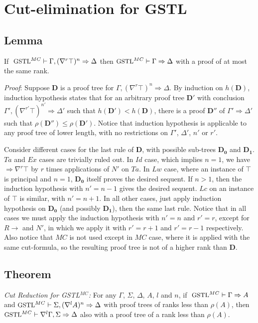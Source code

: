 \section{Cut-elimination for GSTL}

\subsection{Lemma}\label{true-assum} If $~\small\text{GSTL}^{MC} \vdash \Gamma , (\nabla^r \top)^n \Rightarrow \Delta$ then $\small\text{GSTL}^{MC} \vdash \Gamma \Rightarrow \Delta$ with a proof of at most the same rank.

\textit{Proof}: Suppose $\mathbf{D}$ is a proof tree for $\Gamma , (\nabla^r \top)^n \Rightarrow \Delta$. By induction on $h(\mathbf{D})$, induction hypothesis states that for an arbitrary proof tree $\mathbf{D}'$ with conclusion $\Gamma' , (\nabla^{r'} \top)^{n'} \Rightarrow \Delta'$ such that $h(\mathbf{D}') < h(\mathbf{D})$, there is a proof $\mathbf{D}''$ of $\Gamma' \Rightarrow \Delta'$ such that $\rho(\mathbf{D}'') \leq \rho(\mathbf{D}')$. Notice that induction hypothesis is applicable to any proof tree of lower length, with no restrictions on $\Gamma'$, $\Delta'$, $n'$ or $r'$.

Consider different cases for the last rule of $\mathbf{D}$, with possible sub-trees $\mathbf{D_0}$ and $\mathbf{D_1}$. $Ta$ and $Ex$ cases are trivially ruled out. In $Id$ case, which implies $n = 1$, we have $\Rightarrow \nabla^r \top$ by $r$ times applications of $N'$ on $Ta$. In $Lw$ case, where an instance of $\top$ is principal and $n = 1$, $\mathbf{D_0}$ itself proves the desired sequent. If $n > 1$, then the induction hypothesis with $n' = n - 1$ gives the desired sequent. $Lc$ on an instance of $\top$ is similar, with $n' = n + 1$. In all other cases, just apply induction hypothesis on $\mathbf{D_0}$ (and possibly $\mathbf{D_1}$), then the same last rule. Notice that in all cases we must apply the induction hypothesis with $n' = n$ and $r' = r$, except for $R\rightarrow$ and $N'$, in which we apply it with $r' = r + 1$ and $r' = r - 1$ respectively. Also notice that $MC$ is not used except in $MC$ case, where it is applied with the same cut-formula, so the resulting proof tree is not of a higher rank than $\mathbf{D}$.

\subsection{Theorem}\label{cut-admis} \emph{Cut Reduction for GSTL$^{MC}$: } For any $\Gamma$, $\Sigma$, $\Delta$, $A$, $l$ and $n$, if $~\small\text{GSTL}^{MC} \vdash \Gamma \Rightarrow A$ and $\small\text{GSTL}^{MC} \vdash \Sigma , (\nabla^l A)^n \Rightarrow \Delta$ with proof trees of ranks less than $\rho(A)$, then
 $\small\text{GSTL}^{MC} \vdash \nabla^l \Gamma , \Sigma \Rightarrow \Delta$ also with a proof tree of a rank less than $\rho(A)$.
 
